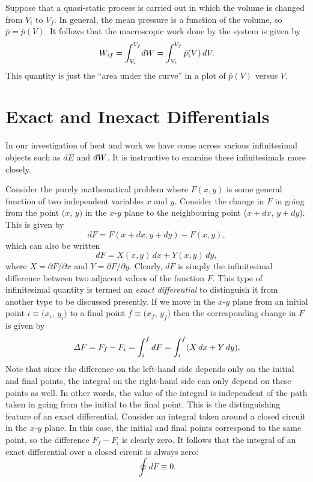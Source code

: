 Suppose that a quasi-static process is carried out in which the volume is changed
from $V_i$ to $V_f$. In general, the mean pressure is a function of the volume, so
 $\bar{p} = \bar{p}(V)$. It follows that the macroscopic work done by the
system is given by
\begin{equation}
W_{if} = \int_{V_i}^{V_f} \dbar W = \int_{V_i}^{V_f} \bar{p}(V)\, dV.
\end{equation}
This quantity is just the ``area under the curve'' in a plot of $\bar{p}(V)$ versus
$V$.

\section{Exact and Inexact Differentials}\label{s4.5}
In our investigation of heat and work we have come across 
various infinitesimal objects such as $d\bar{E}$ and $\,\dbar W$.
It is instructive to examine these infinitesimals more closely.

Consider the purely mathematical problem where $F(x, y)$ is some general
function of two
independent variables $x$ and $y$. Consider the change in $F$ in
going from the point $(x$, $y)$ in the $x$-$y$ plane to the neighbouring point
($x+dx$, $y+dy$). This is given by
\begin{equation}
dF = F(x + dx, y+dy)- F(x,y),
\end{equation}
which can also be written
\begin{equation}
dF = X(x,y) \,dx + Y(x,y)\, dy,\label{e4.23}
\end{equation}
where $X= \partial F/\partial x$ and $Y=\partial F/\partial y$. Clearly, $dF$ is
simply the infinitesimal difference between two adjacent values of the function $F$.
This type of infinitesimal quantity is termed an {\em exact differential}\/ to
distinguish it from another type to be discussed presently.
If we move in the $x$-$y$ plane from an initial point $i\equiv (x_i$, $y_i)$ 
to a final point  $f \equiv (x_f$, $y_f)$ then the corresponding change in $F$ is
given by
\begin{equation}
{\mit\Delta} F = F_f - F_i = \int_i^f dF= \int_i^f(X\,dx + Y\,dy).
\end{equation}
Note that since the difference on the left-hand side depends only on the initial
and final points, the integral on the right-hand side can only depend on 
these points as well.
In other words, the value of the
integral is independent of the path taken in going from the initial to the final
point. This is the distinguishing feature of an exact differential. 
Consider an integral taken around a closed circuit in the $x$-$y$ plane. In this
case, the initial and final points correspond to the same point, so the difference
$F_f- F_i$ is clearly zero. It follows that the integral of an exact differential
over a closed circuit is always zero:
\begin{equation}
\oint dF \equiv 0.
\end{equation}

